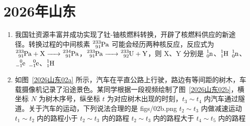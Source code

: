\documentclass[\gkver]{gaokaozhenti}
\begin{document}
\chapter{2026年山东}

\begin{enumerate}
\item
我国钍资源丰富并成功实现了钍-铀核燃料转换，开辟了核燃料供应的新途径。转换过程的中间核素 $\ce{^{233}_{91}Pa}$ 可能会经历两种核反应，反应式为 $\ce{^{233}_{91}Pa + X -> ^{234}_{91}Pa}$，$\ce{^{233}_{91}Pa -> ^{233}_{92}U + Y}$，则 X、Y 分别是 
{$\ce{^{1}_{0}n}$、$\ce{^{1}_{1}H}$}
{$\ce{^{1}_{0}n}$、$\ce{^{0}_{-1}e}$}
{$\ce{^{0}_{-1}e}$、$\ce{^{1}_{1}H}$}

\item
如图~\ref{2026山东02a} 所示，汽车在平直公路上行驶，路边有等间距的树木，车载摄像机记录了沿途景色。某同学根据一段视频绘制了图~\ref{2026山东02b}，横坐标 $N$ 为树木序号，纵坐标 $t$ 为对应树木出现的时刻，$t_{3} \sim t_{4}$ 内汽车通过隧道。关于汽车的运动，下列说法合理的是 
{figs/02b.png}
{$t_{2} \sim t_{3}$ 内做减速运动}
{$t_{1} \sim t_{2}$ 内的路程小于 $t_{2} \sim t_{3}$ 内的路程}
{$t_{2} \sim t_{3}$ 内的路程大于 $t_{4} \sim t_{5}$ 内的路程}
\end{enumerate}
\end{document}

